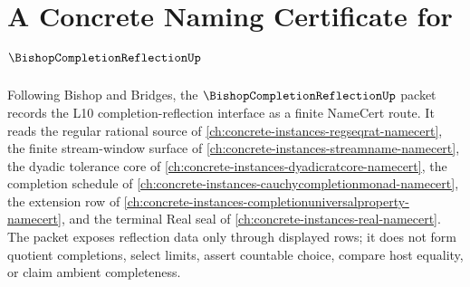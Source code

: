 \chapter{A Concrete Naming Certificate for $\BishopCompletionReflectionUp$}
\label{ch:concrete-instances-bishop-completion-reflection-namecert}

Following Bishop and Bridges, the $\BishopCompletionReflectionUp$ packet records the L10 completion-reflection interface as a finite NameCert route. It reads the regular rational source of \autoref{ch:concrete-instances-regseqrat-namecert}, the finite stream-window surface of \autoref{ch:concrete-instances-streamname-namecert}, the dyadic tolerance core of \autoref{ch:concrete-instances-dyadicratcore-namecert}, the completion schedule of \autoref{ch:concrete-instances-cauchycompletionmonad-namecert}, the extension row of \autoref{ch:concrete-instances-completionuniversalproperty-namecert}, and the terminal Real seal of \autoref{ch:concrete-instances-real-namecert}. The packet exposes reflection data only through displayed rows; it does not form quotient completions, select limits, assert countable choice, compare host equality, or claim ambient completeness.

